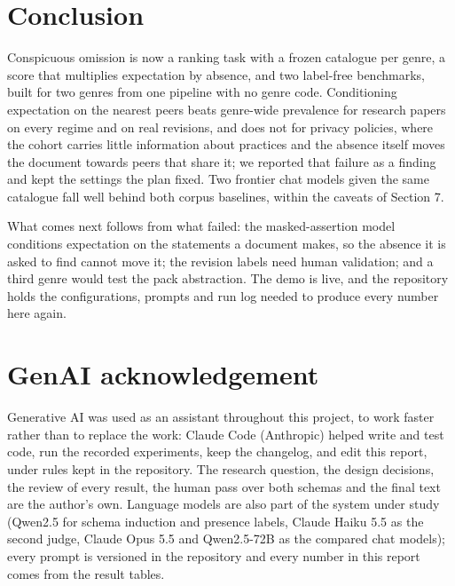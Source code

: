 \documentclass[11pt,a4paper]{article}
\begin{document}
\section{Conclusion}

Conspicuous omission is now a ranking task with a frozen catalogue per genre, a score that multiplies expectation by absence, and two label-free benchmarks, built for two genres from one pipeline with no genre code. Conditioning expectation on the nearest peers beats genre-wide prevalence for research papers on every regime and on real revisions, and does not for privacy policies, where the cohort carries little information about practices and the absence itself moves the document towards peers that share it; we reported that failure as a finding and kept the settings the plan fixed. Two frontier chat models given the same catalogue fall well behind both corpus baselines, within the caveats of Section 7.

What comes next follows from what failed: the masked-assertion model conditions expectation on the statements a document makes, so the absence it is asked to find cannot move it; the revision labels need human validation; and a third genre would test the pack abstraction. The demo is live, and the repository holds the configurations, prompts and run log needed to produce every number here again.

\section*{GenAI acknowledgement}

Generative AI was used as an assistant throughout this project, to work faster rather than to replace the work: Claude Code (Anthropic) helped write and test code, run the recorded experiments, keep the changelog, and edit this report, under rules kept in the repository. The research question, the design decisions, the review of every result, the human pass over both schemas and the final text are the author's own. Language models are also part of the system under study (Qwen2.5 for schema induction and presence labels, Claude Haiku 5.5 as the second judge, Claude Opus 5.5 and Qwen2.5-72B as the compared chat models); every prompt is versioned in the repository and every number in this report comes from the result tables.
\end{document}
